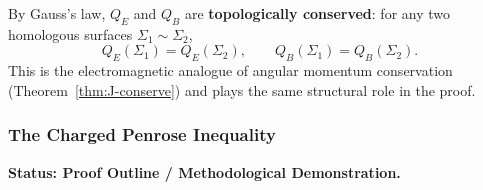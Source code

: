 \begin{remark}
By Gauss's law, $Q_E$ and $Q_B$ are \textbf{topologically conserved}: for any two homologous surfaces $\Sigma_1 \sim \Sigma_2$,
\begin{equation}
    Q_E(\Sigma_1) = Q_E(\Sigma_2), \qquad Q_B(\Sigma_1) = Q_B(\Sigma_2).
\end{equation}
This is the electromagnetic analogue of angular momentum conservation (Theorem~\ref{thm:J-conserve}) and plays the same structural role in the proof.
\end{remark}

\subsubsection{The Charged Penrose Inequality}

\textbf{Status: Proof Outline / Methodological Demonstration.}

